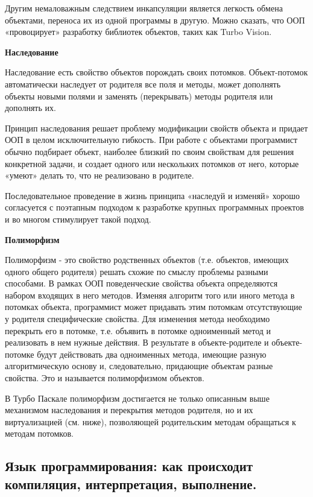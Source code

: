 \documentclass{article}
\begin{document}
Другим немаловажным следствием инкапсуляции является легкость обмена объектами, переноса их из одной программы в другую. Можно сказать, что ООП «провоцирует» разработку библиотек объектов, таких как Turbo Vision.

{ \bf Наследование}

Наследование есть свойство объектов порождать своих потомков. Объект-потомок автоматически наследует от родителя все поля и методы, может дополнять объекты новыми полями и заменять (перекрывать) методы родителя или дополнять их.

Принцип наследования решает проблему модификации свойств объекта и придает ООП в целом исключительную гибкость. При работе с объектами программист обычно подбирает объект, наиболее близкий по своим свойствам для решения конкретной задачи, и создает одного или нескольких потомков от него, которые «умеют» делать то, что не реализовано в родителе.

Последовательное проведение в жизнь принципа «наследуй и изменяй» хорошо согласуется с поэтапным подходом к разработке крупных программных проектов и во многом стимулирует такой подход.

{ \bf Полиморфизм}

Полиморфизм - это свойство родственных объектов (т.е. объектов, имеющих одного общего родителя) решать схожие по смыслу проблемы разными способами. В рамках ООП поведенческие свойства объекта определяются набором входящих в него методов. Изменяя алгоритм того или иного метода в потомках объекта, программист может придавать этим потомкам отсутствующие у родителя специфические свойства. Для изменения метода необходимо перекрыть его в потомке, т.е. объявить в потомке одноименный метод и реализовать в нем нужные действия. В результате в объекте-родителе и объекте-потомке будут действовать два одноименных метода, имеющие разную алгоритмическую основу и, следовательно, придающие объектам разные свойства. Это и называется полиморфизмом объектов.

В Турбо Паскале полиморфизм достигается не только описанным выше механизмом наследования и перекрытия методов родителя, но и их виртуализацией (см. ниже), позволяющей родительским методам обращаться к методам потомков.

\subsection{Язык программирования: как происходит компиляция, интерпретация, выполнение.}
\end{document}
